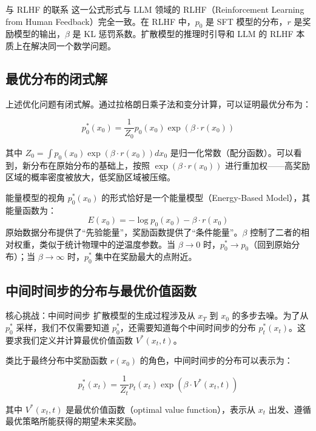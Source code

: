 \begin{knowledgebox}{与 RLHF 的联系}
这一公式形式与 LLM 领域的 RLHF（Reinforcement Learning from Human Feedback）完全一致。在 RLHF 中，$p_0$ 是 SFT 模型的分布，$r$ 是奖励模型的输出，$\beta$ 是 KL 惩罚系数。扩散模型的推理时引导和 LLM 的 RLHF 本质上在解决同一个数学问题。
\end{knowledgebox}

\subsection{最优分布的闭式解}

上述优化问题有闭式解。通过拉格朗日乘子法和变分计算，可以证明最优分布为：

$$p_0^*(x_0) = \frac{1}{Z_0} p_0(x_0) \exp(\beta \cdot r(x_0))$$

其中 $Z_0 = \int p_0(x_0) \exp(\beta \cdot r(x_0)) dx_0$ 是归一化常数（配分函数）。可以看到，新分布在原始分布的基础上，按照 $\exp(\beta \cdot r(x_0))$ 进行重加权——高奖励区域的概率密度被放大，低奖励区域被压缩。

\begin{knowledgebox}{能量模型的视角}
$p_0^*(x_0)$ 的形式恰好是一个能量模型（Energy-Based Model），其能量函数为：
$$E(x_0) = -\log p_0(x_0) - \beta \cdot r(x_0)$$
原始数据分布提供了``先验能量''，奖励函数提供了``条件能量''。$\beta$ 控制了二者的相对权重，类似于统计物理中的逆温度参数。当 $\beta \to 0$ 时，$p_0^* \to p_0$（回到原始分布）；当 $\beta \to \infty$ 时，$p_0^*$ 集中在奖励最大的点附近。
\end{knowledgebox}

\subsection{中间时间步的分布与最优价值函数}

\begin{importantbox}{核心挑战：中间时间步}
扩散模型的生成过程涉及从 $x_T$ 到 $x_0$ 的多步去噪。为了从 $p_0^*$ 采样，我们不仅需要知道 $p_0^*$，还需要知道每个中间时间步的分布 $p_t^*(x_t)$。这要求我们定义并计算最优价值函数 $V^*(x_t, t)$。
\end{importantbox}

类比于最终分布中奖励函数 $r(x_0)$ 的角色，中间时间步的分布可以表示为：

$$p_t^*(x_t) = \frac{1}{Z_t} p_t(x_t) \exp(\beta \cdot V^*(x_t, t))$$

其中 $V^*(x_t, t)$ 是最优价值函数（optimal value function），表示从 $x_t$ 出发、遵循最优策略所能获得的期望未来奖励。

